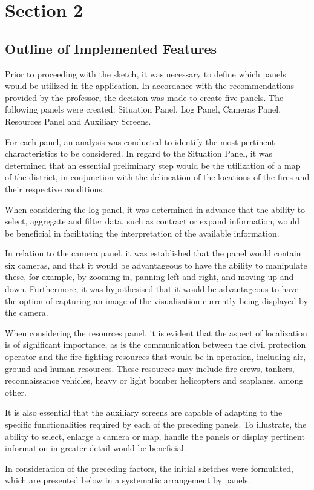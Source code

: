 \chapter{Section 2} \label{section2}
\section{Outline of Implemented Features}
Prior to proceeding with the sketch, it was necessary to define which panels would be utilized in the application. In accordance with the recommendations provided by the professor, the decision was made to create five panels. The following panels were created: Situation Panel, Log Panel, Cameras Panel, Resources Panel and Auxiliary Screens. \par
For each panel, an analysis was conducted to identify the most pertinent characteristics to be considered. In regard to the Situation Panel, it was determined that an essential preliminary step would be the utilization of a map of the district, in conjunction with the delineation of the locations of the fires and their respective conditions. \par
When considering the log panel, it was determined in advance that the ability to select, aggregate and filter data, such as contract or expand information, would be beneficial in facilitating the interpretation of the available information. \par
In relation to the camera panel, it was established that the panel would contain six cameras, and that it would be advantageous to have the ability to manipulate these, for example, by zooming in, panning left and right, and moving up and down. Furthermore, it was hypothesised that it would be advantageous to have the option of capturing an image of the visualisation currently being displayed by the camera. \par
When considering the resources panel, it is evident that the aspect of localization is of significant importance, as is the communication between the civil protection operator and the fire-fighting resources that would be in operation, including air, ground and human resources. These resources may include fire crews, tankers, reconnaissance vehicles, heavy or light bomber helicopters and seaplanes, among other. \par
It is also essential that the auxiliary screens are capable of adapting to the specific functionalities required by each of the preceding panels. To illustrate, the ability to select, enlarge a camera or map, handle the panels or display pertinent information in greater detail would be beneficial. \par
In consideration of the preceding factors, the initial sketches were formulated, which are presented below in a systematic arrangement by panels. \par
